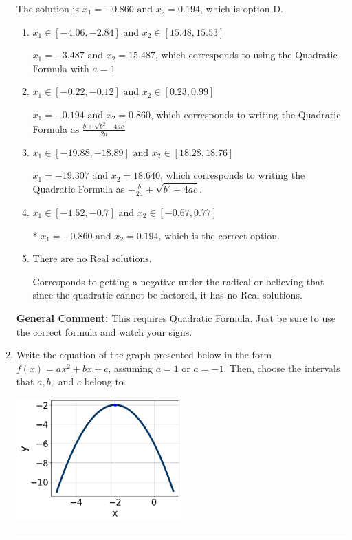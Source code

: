 \documentclass{extbook}[14pt]
\newcommand{\litem}[1]{\item #1

\rule{\textwidth}{0.4pt}}
\begin{document}
\begin{enumerate}
{The solution is \( x_1 = -0.860 \text{ and } x_2 = 0.194 \), which is option D.\begin{enumerate}[label=\Alph*.]
\item \( x_1 \in [-4.06, -2.84] \text{ and } x_2 \in [15.48, 15.53] \)

 $x_1 = -3.487 \text{ and } x_2 = 15.487$, which corresponds to using the Quadratic Formula with $a=1$
\item \( x_1 \in [-0.22, -0.12] \text{ and } x_2 \in [0.23, 0.99] \)

 $x_1 = -0.194 \text{ and } x_2 = 0.860$, which corresponds to writing the Quadratic Formula as $\frac{b \pm \sqrt{b^2 - 4ac}}{2a}$
\item \( x_1 \in [-19.88, -18.89] \text{ and } x_2 \in [18.28, 18.76] \)

 $x_1 = -19.307 \text{ and } x_2 = 18.640$, which corresponds to writing the Quadratic Formula as $-\frac{b}{2a} \pm \sqrt{b^2 - 4ac}$.
\item \( x_1 \in [-1.52, -0.7] \text{ and } x_2 \in [-0.67, 0.77] \)

* $x_1 = -0.860 \text{ and } x_2 = 0.194$, which is the correct option.
\item \( \text{There are no Real solutions.} \)

Corresponds to getting a negative under the radical or believing that since the quadratic cannot be factored, it has no Real solutions.
\end{enumerate}

\textbf{General Comment:} This requires Quadratic Formula. Just be sure to use the correct formula and watch your signs.
}
\litem{
Write the equation of the graph presented below in the form $f(x)=ax^2+bx+c$, assuming  $a=1$ or $a=-1$. Then, choose the intervals that $a, b,$ and $c$ belong to.

\begin{center}
    \includegraphics[width=0.5\textwidth]{../Figures/quadraticGraphToEquationB.png}
\end{center}




}
\end{enumerate}
\end{document}
